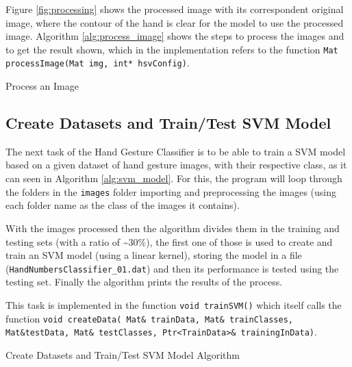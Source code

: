 \documentclass[a4paper,10pt,english]{article}
\begin{document}
        
        Figure \ref{fig:processing} shows the processed image with its correspondent original image, where the contour of the hand is clear for the model to use the processed image. Algorithm \ref{alg:process_image} shows the steps to process the images and to get the result shown, which in the implementation refers to the function \texttt{Mat processImage(Mat img, int* hsvConfig)}.
        
        \IncMargin{1em}
        \begin{algorithm}[H]
            \BlankLine
            \caption{Process an Image} \label{alg:process_image}
        \end{algorithm}
        
        \subsection{Create Datasets and Train/Test SVM Model}
        
        The next task of the Hand Gesture Classifier is to be able to train a SVM model based on a given dataset of hand gesture images, with their respective class, as it can seen in Algorithm \ref{alg:svm_model}. For this, the program will loop through the folders in the \texttt{images} folder importing and preprocessing the images (using each folder name as the class of the images it contains).
        
        With the images processed then the algorithm divides them in the training and testing sets (with a ratio of \textasciitilde{}30\%), the first one of those is used to create and train an SVM model (using a linear kernel), storing the model in a file (\texttt{HandNumbersClassifier\_01.dat}) and then its performance is tested using the testing set. Finally the algorithm prints the results of the process.
        
        This task is implemented in the function \texttt{void trainSVM()} which itself calls the function \texttt{void createData( Mat\& trainData, Mat\& trainClasses, Mat\&testData, Mat\& testClasses, Ptr<TrainData>\& trainingInData)}.
        
        \begin{algorithm}[H]
            \BlankLine
            \caption{Create Datasets and Train/Test SVM Model Algorithm} \label{alg:svm_model}
        \end{algorithm}
        
\end{document}
